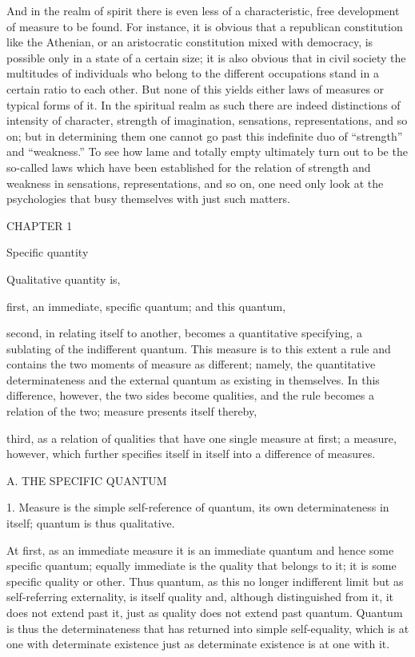And in the realm of spirit there is even less of
a characteristic, free development of measure to be found.
For instance, it is obvious that a
republican constitution like the Athenian,
or an aristocratic constitution mixed with democracy,
is possible only in a state of a certain size;
it is also obvious that in civil society
the multitudes of individuals who belong to
the different occupations stand in a certain ratio to each other.
But none of this yields either laws of measures or typical forms of it.
In the spiritual realm as such there are indeed
distinctions of intensity of character,
strength of imagination, sensations, representations, and so on;
but in determining them one cannot go past this indefinite duo of
“strength” and “weakness.”
To see how lame and totally empty ultimately turn out to be
the so-called laws which have been established for
the relation of strength and weakness in sensations,
representations, and so on, one need only look at
the psychologies that busy themselves with just such matters.

CHAPTER 1

Specific quantity

Qualitative quantity is,

first, an immediate, specific quantum; and this quantum,

second, in relating itself to another,
becomes a quantitative specifying,
a sublating of the indifferent quantum.
This measure is to this extent a rule
and contains the two moments of measure as different;
namely, the quantitative determinateness
and the external quantum as existing in themselves.
In this difference, however, the two sides become qualities,
and the rule becomes a relation of the two;
measure presents itself thereby,

third, as a relation of qualities that have one single measure at first;
a measure, however, which further specifies itself in itself
into a difference of measures.

A. THE SPECIFIC QUANTUM

1. Measure is the simple self-reference of quantum,
its own determinateness in itself;
quantum is thus qualitative.

At first, as an immediate measure it is
an immediate quantum and hence some specific quantum;
equally immediate is the quality that belongs to it;
it is some specific quality or other.
Thus quantum, as this no longer indifferent limit
but as self-referring externality, is itself quality
and, although distinguished from it,
it does not extend past it,
just as quality does not extend past quantum.
Quantum is thus the determinateness
that has returned into simple self-equality,
which is at one with determinate existence
just as determinate existence is at one with it.

